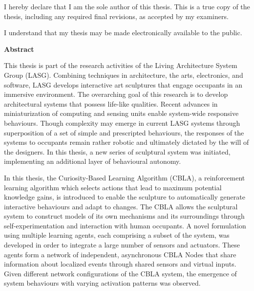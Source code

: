 \cleardoublepage %
 


  \noindent
I hereby declare that I am the sole author of this thesis. This is a true copy of the thesis, including any required final revisions, as accepted by my examiners.

  \bigskip
  
  \noindent
I understand that my thesis may be made electronically available to the public.

\cleardoublepage


\begin{center}\textbf{Abstract}\end{center}

This thesis is part of the research activities of the Living Architecture System Group (LASG). Combining techniques in architecture, the arts, electronics, and software, LASG develops interactive art sculptures that engage occupants in an immersive environment. The overarching goal of this research is to develop architectural systems that possess life-like qualities. Recent advances in miniaturization of computing and sensing units enable system-wide responsive behaviours. Though complexity may emerge in current LASG systems through superposition of a set of simple and prescripted behaviours, the responses of the systems to occupants remain rather robotic and ultimately dictated by the will of the designers. In this thesis, a new series of sculptural system was initiated, implementing an additional layer of behavioural autonomy.  

In this thesis, the Curiosity-Based Learning Algorithm (CBLA), a reinforcement learning algorithm which selects actions that lead to maximum potential knowledge gains, is introduced to enable the sculpture to automatically generate interactive behaviours and adapt to changes. The CBLA allows the sculptural system to construct models of its own mechanisms and its surroundings through self-experimentation and interaction with human occupants. A novel formulation using multiple learning agents, each comprising a subset of the system, was developed in order to integrate a large number of sensors and actuators. These agents form a network of independent, asynchronous CBLA Nodes that share information about localized events through shared sensors and virtual inputs. Given different network configurations of the CBLA system, the emergence of system behaviours with varying activation patterns was observed. 

